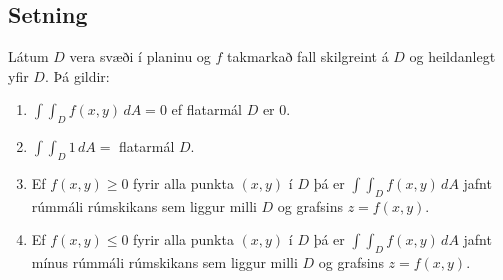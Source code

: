 \documentclass[a4paper,10pt,icelandic]{sphinxmanual}
\begin{document}
\subsection{Setning}
\label{Kafli4:id4}
Látum \(D\) vera svæði í planinu og \(f\) takmarkað fall
skilgreint á \(D\) og heildanlegt yfir \(D\). Þá gildir:
\begin{enumerate}
\item {} 
\(\int\!\!\!\int_D f(x,y)\,dA=0\) ef flatarmál \(D\) er 0.

\item {} 
\(\int\!\!\!\int_D 1\,dA=\) flatarmál \(D\).

\item {} 
Ef \(f(x,y)\geq 0\) fyrir alla punkta \((x,y)\) í \(D\)
þá er \(\int\!\!\!\int_D f(x,y)\,dA\) jafnt rúmmáli rúmskikans
sem liggur milli \(D\) og grafsins \(z=f(x,y)\).

\item {} 
Ef \(f(x,y)\leq 0\) fyrir alla punkta \((x,y)\) í \(D\)
þá er \(\int\!\!\!\int_D f(x,y)\,dA\) jafnt mínus rúmmáli
rúmskikans sem liggur milli \(D\) og grafsins \(z=f(x,y)\).

\end{enumerate}
\end{document}
